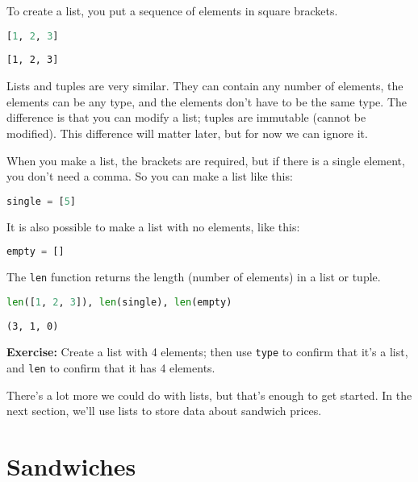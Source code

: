 To create a list, you put a sequence of elements in square brackets.

\begin{lstlisting}[language=Python]
[1, 2, 3]
\end{lstlisting}

\begin{lstlisting}[]
[1, 2, 3]
\end{lstlisting}

Lists and tuples are very similar. They can contain any number of
elements, the elements can be any type, and the elements don't have to
be the same type. The difference is that you can modify a list; tuples
are immutable (cannot be modified). This difference will matter later,
but for now we can ignore it.

When you make a list, the brackets are required, but if there is a
single element, you don't need a comma. So you can make a list like
this:

\begin{lstlisting}[language=Python]
single = [5]
\end{lstlisting}

It is also possible to make a list with no elements, like this:

\begin{lstlisting}[language=Python]
empty = []
\end{lstlisting}

The \passthrough{\lstinline!len!} function returns the length (number of
elements) in a list or tuple.

\begin{lstlisting}[language=Python]
len([1, 2, 3]), len(single), len(empty)
\end{lstlisting}

\begin{lstlisting}[]
(3, 1, 0)
\end{lstlisting}

\textbf{Exercise:} Create a list with 4 elements; then use
\passthrough{\lstinline!type!} to confirm that it's a list, and
\passthrough{\lstinline!len!} to confirm that it has 4 elements.

There's a lot more we could do with lists, but that's enough to get
started. In the next section, we'll use lists to store data about
sandwich prices.

\hypertarget{sandwiches}{%
\section{Sandwiches}\label{sandwiches}}

